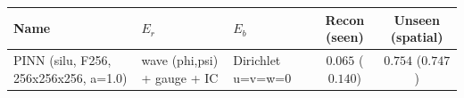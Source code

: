 \begin{center}
\begin{tabular}{lll cc}
\toprule
Name & $E_r$ & $E_b$ & Recon (seen) & Unseen (spatial) \\
\midrule
PINN (silu, F256, 256x256x256, a=1.0) & wave (phi,psi) + gauge + IC & Dirichlet u=v=w=0 & $0.065$ ($0.140$) & $0.754$ ($0.747$) \\
\bottomrule
\end{tabular}
\end{center}
